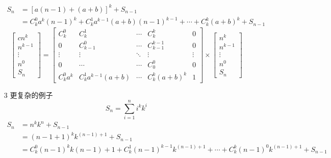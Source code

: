 \begin{itemize}
        \begin{align*}
            S_{n}&=[a(n-1)+(a+b)]^{k}+S_{n-1}\\ 
            &=C_{k}^{0} a^{k}(n-1)^{k}+C_{k}^{1} a^{k-1}(a+b)(n-1)^{k-1}+\cdots+C_{k}^{k}(a+b)^{k}+S_{n-1}
        \end{align*}
        \begin{equation*}
        \left[
        \begin{matrix}
            {c}{n^{k}} \\ 
            {n^{k-1}} \\ 
            {\vdots} \\ 
            {n^{0}} \\
            {S_{n}}
        \end{matrix}
        \right]
        =
        \left[
        \begin{matrix}
        {C_{k}^{0}} &{C_{k}^{1}} & {\cdots} & {C_{k}^{k}} & {0} \\
        {0} & {C_{k-1}^{0}} & {\cdots} & {C_{k-1}^{k-1}} & {0} \\
        {\vdots} & {\vdots} & {\ddots} & {\vdots} & {\vdots} \\ 
        {0} & {\cdots} & {\cdots} & {C_{0}^{0}} & {0} \\ 
        {C_{k}^{0} a^{k}} & {C_{k}^{1} a^{k-1}(a+b)} & {\cdots} & {C_{k}^{k}(a+b)^{k}} & {1}
        \end{matrix}
        \right]
        \times
        \left[
        \begin{matrix}
        {n^{k}} \\
        {n^{k-1}} \\
        {\vdots} \\ 
        {n^{0}} \\ 
        {S_{n}}
        \end{matrix}
        \right]
        \end{equation*}
    \item[3] 更复杂的例子
        \begin{equation*}
            S_{n}=\sum_{i=1}^{n} i^{k} k^{i}
        \end{equation*}
        \begin{align*}
            S_n&=n^kk^n+S_{n-1}\\
            &=(n-1+1)^kk^{(n-1)+1}+S_{n-1}\\
            &=C_k^0(n-1)^kk{(n-1)+1}+C_k^1(n-1)^{k-1}k^{(n-1)+1}+\cdots+C_k^k(n-1)^0k^{(n-1)+1}+S_{n-1}
        \end{align*}

\end{itemize}
